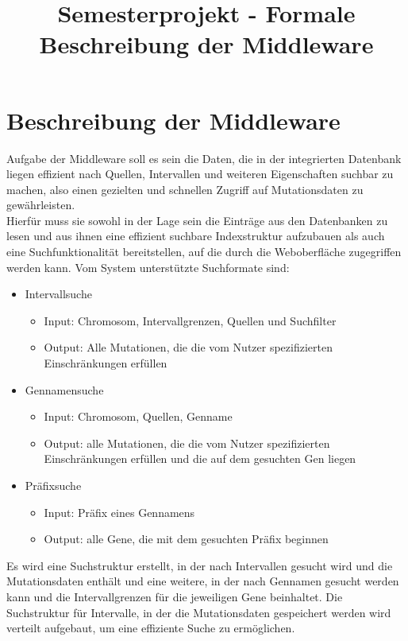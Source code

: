 \documentclass[]{article}
\title{Semesterprojekt - Formale Beschreibung der Middleware}
\begin{document}
\maketitle
\section{Beschreibung der Middleware}
Aufgabe der Middleware soll es sein die Daten, die in der integrierten Datenbank liegen effizient nach Quellen, Intervallen und weiteren Eigenschaften suchbar zu machen, also einen gezielten und schnellen Zugriff auf Mutationsdaten zu gewährleisten.\\ Hierfür muss sie sowohl in der Lage sein die Einträge aus den Datenbanken zu lesen und aus ihnen eine effizient suchbare Indexstruktur aufzubauen als auch eine Suchfunktionalität bereitstellen, auf die durch die Weboberfläche zugegriffen werden kann. Vom System unterstützte Suchformate sind:
\begin{itemize}
\item Intervallsuche
\begin{itemize}
\item Input: Chromosom, Intervallgrenzen, Quellen und Suchfilter
\item Output: Alle Mutationen, die die vom Nutzer spezifizierten Einschränkungen erfüllen
\end{itemize}
\item Gennamensuche
\begin{itemize}
\item Input: Chromosom, Quellen, Genname
\item Output: alle Mutationen, die die vom Nutzer spezifizierten Einschränkungen erfüllen und die auf dem gesuchten Gen liegen
\end{itemize}
\item Präfixsuche
\begin{itemize}
\item Input: Präfix eines Gennamens
\item Output: alle Gene, die mit dem gesuchten Präfix beginnen
\end{itemize}
\end{itemize} 
Es wird eine Suchstruktur erstellt, in der nach Intervallen gesucht wird und die Mutationsdaten enthält und eine weitere, in der nach Gennamen gesucht werden kann und die Intervallgrenzen für die jeweiligen Gene beinhaltet.
Die Suchstruktur für Intervalle, in der die Mutationsdaten gespeichert werden wird verteilt aufgebaut, um eine effiziente Suche zu ermöglichen.\\
\end{document}
